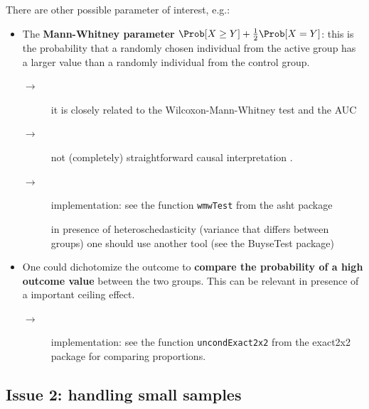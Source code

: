 \documentclass[12pt]{article}
\newcommand\Warning[1][3ex]{%
\renewcommand\stacktype{L}%
\scaleto{\stackon[1.3pt]{\color{red}$\triangle$}{\tiny\bfseries !}}{#1}%
\xspace
}
\begin{document}
\noindent There are other possible parameter of interest, e.g.:
\begin{itemize}
\item The \textbf{Mann-Whitney parameter} \(\Prob[X\geq Y] +
  \frac{1}{2}\Prob[X=Y]\): this is the probability that a randomly
chosen individual from the active group has a larger value than a
randomly individual from the control group. 
\begin{description}
\item[{\(\rightarrow\)}] it is closely related to the
Wilcoxon-Mann-Whitney test and the AUC
\item[{\(\rightarrow\)}] not (completely) straightforward causal
interpretation \citep{fay2018causal}.
\item[{\(\rightarrow\)}] implementation: see the function \texttt{wmwTest} from
the asht package \newline \Warning in presence of
heteroschedasticity (variance that differs between groups) one
should use another tool (see the BuyseTest package)
\end{description}

\item One could dichotomize the outcome to \textbf{compare the probability of a
high outcome value} between the two groups. This can be relevant in
presence of a important ceiling effect.
\begin{description}
\item[{\(\rightarrow\)}] implementation: see the function
\texttt{uncondExact2x2} from the exact2x2 package for comparing
proportions.
\end{description}
\end{itemize}

\clearpage

\subsection{Issue 2: handling small samples}
\label{sec:org08c44f8}
\end{document}
